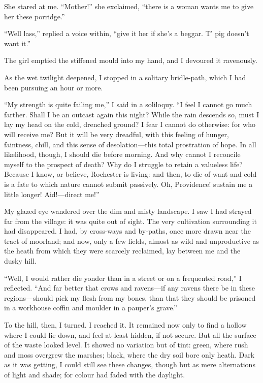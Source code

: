 She stared at me. \enquote{Mother!} she exclaimed, \enquote{there is a
	woman wants me to give her these porridge.}

\enquote{Well lass,} replied a voice within, \enquote{give it her if
	she's a beggar. T' pig doesn't want it.}

The girl emptied the stiffened mould into my hand, and I devoured it
ravenously.

As the wet twilight deepened, I stopped in a solitary bridle-path, which
I had been pursuing an hour or more.

\enquote{My strength is quite failing me,} I said in a soliloquy.
\enquote{I feel I cannot go much farther. Shall I be an outcast again
	this night? While the rain descends so, must I lay my head on the cold,
	drenched ground? I fear I cannot do otherwise: for who will receive
	me? But it will be very dreadful, with this feeling of hunger,
	faintness, chill, and this sense of desolation---this total prostration
	of hope. In all likelihood, though, I should die before morning. And
	why cannot I reconcile myself to the prospect of death? Why do I
	struggle to retain a valueless life? Because I know, or believe, \Mr{}
	Rochester is living: and then, to die of want and cold is a fate to
	which nature cannot submit passively. Oh, Providence! sustain me a
	little longer! Aid!---direct me!}

My glazed eye wandered over the dim and misty landscape. I saw I had
strayed far from the village: it was quite out of sight. The very
cultivation surrounding it had disappeared. I had, by cross-ways and
by-paths, once more drawn near the tract of moorland; and now, only a
few fields, almost as wild and unproductive as the heath from which they
were scarcely reclaimed, lay between me and the dusky hill.

\enquote{Well, I would rather die yonder than in a street or on a
	frequented road,} I reflected. \enquote{And far better that crows and
	ravens---if any ravens there be in these regions---should pick my flesh
	from my bones, than that they should be prisoned in a workhouse coffin
	and moulder in a pauper's grave.}

To the hill, then, I turned. I reached it. It remained now only to
find a hollow where I could lie down, and feel at least hidden, if not
secure. But all the surface of the waste looked level. It showed no
variation but of tint: green, where rush and moss overgrew the marshes;
black, where the dry soil bore only heath. Dark as it was getting, I
could still see these changes, though but as mere alternations of light
and shade; for colour had faded with the daylight.


